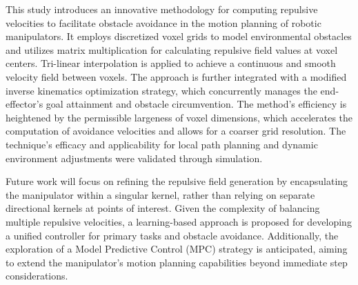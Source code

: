 \documentclass[letterpaper, 10 pt, conference]{ieeeconf}  %
\begin{document}
This study introduces an innovative methodology for computing repulsive velocities to facilitate obstacle avoidance in the motion planning of robotic manipulators. It employs discretized voxel grids to model environmental obstacles and utilizes matrix multiplication for calculating repulsive field values at voxel centers. Tri-linear interpolation is applied to achieve a continuous and smooth velocity field between voxels. The approach is further integrated with a modified inverse kinematics optimization strategy, which concurrently manages the end-effector's goal attainment and obstacle circumvention. The method's efficiency is heightened by the permissible largeness of voxel dimensions, which accelerates the computation of avoidance velocities and allows for a coarser grid resolution. The technique's efficacy and applicability for local path planning and dynamic environment adjustments were validated through simulation.

Future work will focus on refining the repulsive field generation by encapsulating the manipulator within a singular kernel, rather than relying on separate directional kernels at points of interest. Given the complexity of balancing multiple repulsive velocities, a learning-based approach is proposed for developing a unified controller for primary tasks and obstacle avoidance. Additionally, the exploration of a Model Predictive Control (MPC) strategy is anticipated, aiming to extend the manipulator's motion planning capabilities beyond immediate step considerations.

\addtolength{\textheight}{-12cm}   %
\end{document}
